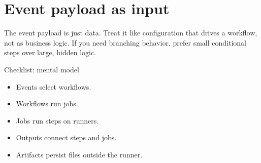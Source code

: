 \section{Event payload as input}
The event payload is just data.
Treat it like configuration that drives a workflow, not as business logic.
If you need branching behavior, prefer small conditional steps over large, hidden logic.

\begin{checklistbox}{Checklist: mental model}
\begin{itemize}[nosep]
  \item Events select workflows.
  \item Workflows run jobs.
  \item Jobs run steps on runners.
  \item Outputs connect steps and jobs.
  \item Artifacts persist files outside the runner.
\end{itemize}
\end{checklistbox}

